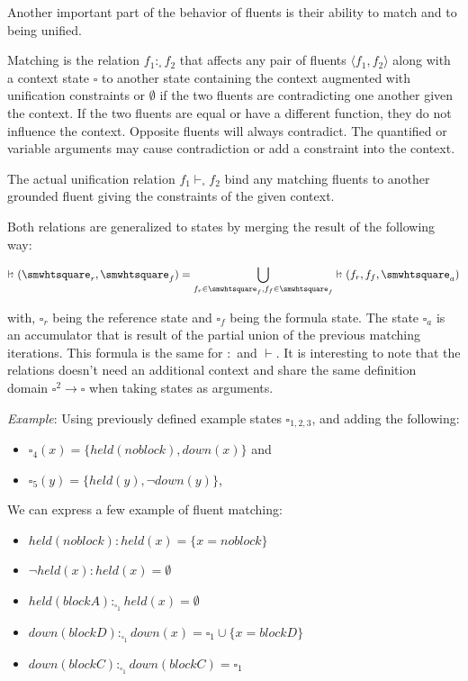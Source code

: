 \documentclass[11pt,a4paper,twoside,openright,titlepage,numbers=noenddot,headinclude,cleardoublepage=empty,openany]{scrreprt}
\theoremstyle{plain}
\theoremstyle{definition}
\theoremstyle{remark}
\providecommand{\tightlist}{%
  \setlength{\itemsep}{0pt}\setlength{\parskip}{0pt}}
\newcommand\colonvdash{\mathrel{\ooalign{\hss$\vdash$\hss\cr\kern0.6ex\raise0.15ex\hbox{\scalebox{1}{$:$}}}}}
\begin{document}
Another important part of the behavior of fluents is their ability to
match and to being unified.

Matching is the relation \(f_1 :_\smwhtsquare f_2\) that affects any
pair of fluents \(\langle f_1, f_2 \rangle\) along with a context state
\(\smwhtsquare\) to another state containing the context augmented with
unification constraints or \(\emptyset\) if the two fluents are
contradicting one another given the context. If the two fluents are
equal or have a different function, they do not influence the context.
Opposite fluents will always contradict. The quantified or variable
arguments may cause contradiction or add a constraint into the context.

The actual unification relation \(f_1 \vdash_\smwhtsquare f_2\) bind any
matching fluents to another grounded fluent giving the constraints of
the given context.

Both relations are generalized to states by merging the result of the
following way:

\[\colonvdash(\smwhtsquare_r, \smwhtsquare_f) = \bigcup_{f_r \in \smwhtsquare_f, f_f \in \smwhtsquare_f} \colonvdash(f_r, f_f, \smwhtsquare_a)\]

with, \(\smwhtsquare_r\) being the reference state and
\(\smwhtsquare_f\) being the formula state. The state \(\smwhtsquare_a\)
is an accumulator that is result of the partial union of the previous
matching iterations. This formula is the same for \(:\) and \(\vdash\).
It is interesting to note that the relations doesn't need an additional
context and share the same definition domain \(\square^2 \to \square\)
when taking states as arguments.

\emph{Example}: Using previously defined example states
\(\smwhtsquare_{1,2,3}\), and adding the following:

\begin{itemize}
\tightlist
\item
  \(\smwhtsquare_4(x) = \{held(noblock), down(x)\}\) and
\item
  \(\smwhtsquare_5(y) = \{held(y), \neg down(y)\}\),
\end{itemize}

We can express a few example of fluent matching:

\begin{itemize}
\tightlist
\item
  \(held(noblock) : held(x) = \{x=noblock\}\)
\item
  \(\neg held(x) : held(x) = \emptyset\)
\item
  \(held(blockA) :_{\smwhtsquare_1} held(x) = \emptyset\)
\item
  \(down(blockD) :_{\smwhtsquare_1} down(x) = \smwhtsquare_1 \cup \{x=blockD\}\)
\item
  \(down(blockC) :_{\smwhtsquare_1} down(blockC) = \smwhtsquare_1\)
\end{itemize}
\end{document}
